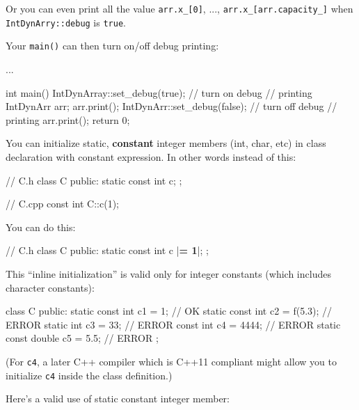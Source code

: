 Or you can even print all the value \texttt{arr.x\_[0]}, ...,
\texttt{arr.x\_[arr.capacity\_]} when \texttt{IntDynArry::debug} is
\texttt{true}.

Your \texttt{main()} can then turn on/off debug printing:

\begin{consolethree}[escapeinside=||]
...

int main()
{
    IntDynArray::set_debug(true); // turn on debug
                                  // printing
    IntDynArr arr;
    arr.print();
    IntDynArr::set_debug(false); // turn off debug
                                 // printing
    arr.print();
    return 0;
}
\end{consolethree}


\newpage{}

You can initialize static, \textbf{constant} integer members (int, char,
etc) in class declaration with constant expression. In other words
instead of this:

\begin{consolethree}[escapeinside=||]
// C.h
class C
{
public:
    static const int c;
};
\end{consolethree}

\begin{consolethree}[escapeinside=||]
// C.cpp
const int C::c(1);
\end{consolethree}

You can do this:

\begin{consolethree}[escapeinside=||]
// C.h
class C
{
public:
    static const int c |{\bf = 1}|;
};
\end{consolethree}

This ``inline initialization'' is valid only for integer constants
(which includes character constants):

\begin{consolethree}[escapeinside=||]
class C
{
public:
    static const int c1 = 1;        // OK
    static const int c2 = f(5.3);   // ERROR
    static int c3 = 33;             // ERROR
    const int c4 = 4444;            // ERROR
    static const double c5 = 5.5;   // ERROR
};
\end{consolethree}

(For \texttt{c4}, a later C++ compiler which is C++11 compliant might
allow you to initialize \texttt{c4} inside the class definition.)

Here's a valid use of static constant integer member:

